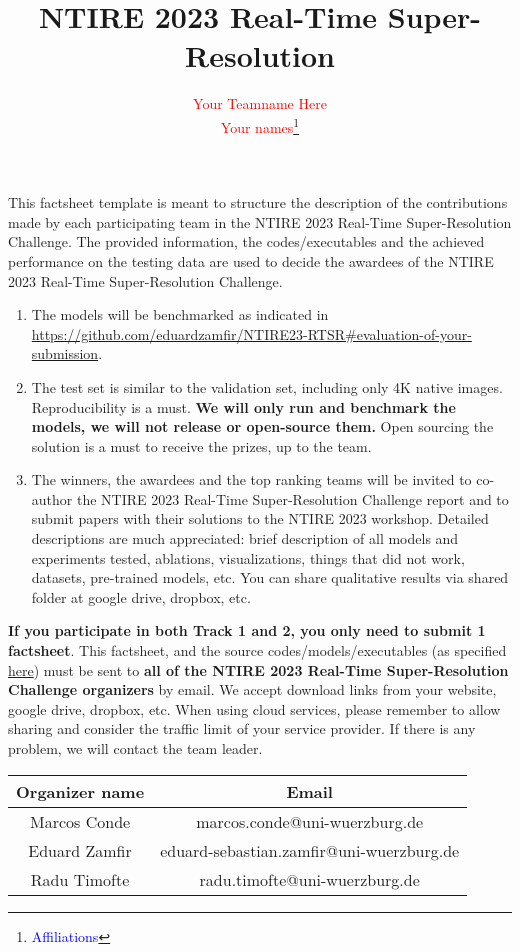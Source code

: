 \documentclass{article}
\title{NTIRE 2023 Real-Time Super-Resolution}
\author{\textcolor{red}{Your Teamname Here}\\
\textcolor{red}{Your names}\thanks{\textcolor{blue}{Affiliations}}\\
}
\begin{document}
\maketitle

This factsheet template is meant to structure the description of the contributions made by each participating team in the NTIRE 2023 Real-Time Super-Resolution Challenge.
%
The provided information, the codes/executables and the achieved performance on the testing data are used to decide the awardees of the NTIRE 2023 Real-Time Super-Resolution Challenge. 

\begin{enumerate}
    \item The models will be benchmarked as indicated in \url{https://github.com/eduardzamfir/NTIRE23-RTSR#evaluation-of-your-submission}.
    \item The test set is similar to the validation set, including only 4K native images. Reproducibility is a must. \textbf{We will only run and benchmark the models, we will not release or open-source them.} Open sourcing the solution is a must to receive the prizes, up to the team.
    \item The winners, the awardees and the top ranking teams will be invited to co-author the NTIRE 2023 Real-Time Super-Resolution Challenge report and to submit papers with their solutions to the NTIRE 2023 workshop. Detailed descriptions are much appreciated: brief description of all models and experiments tested, ablations, visualizations, things that did not work, datasets, pre-trained models, etc. You can share qualitative results via shared folder at google drive, dropbox, etc.
\end{enumerate}

\textbf{If you participate in both Track 1 and 2, you only need to submit 1 factsheet}.
This factsheet, and the source codes/models/executables (as specified \href{https://github.com/eduardzamfir/NTIRE23-RTSR#evaluation-of-your-submission}{here}) must be sent to \textbf{all of the NTIRE 2023 Real-Time Super-Resolution Challenge organizers} by email. We accept download links from your website, google drive, dropbox, etc. When using cloud services, please remember to allow sharing and consider the traffic limit of your service provider. If there is any problem, we will contact the team leader.

\begin{table}[h]
\begin{center}
\begin{tabular}{|c|c|}
    \hline
    Organizer name & Email \\
    \hline
    Marcos Conde  & marcos.conde@uni-wuerzburg.de  \\
    Eduard Zamfir & eduard-sebastian.zamfir@uni-wuerzburg.de  \\
    Radu Timofte  & radu.timofte@uni-wuerzburg.de \\
    \hline
\end{tabular}
\vspace{-0.5cm}
\end{center}
\end{table}
 \newpage
\end{document}
